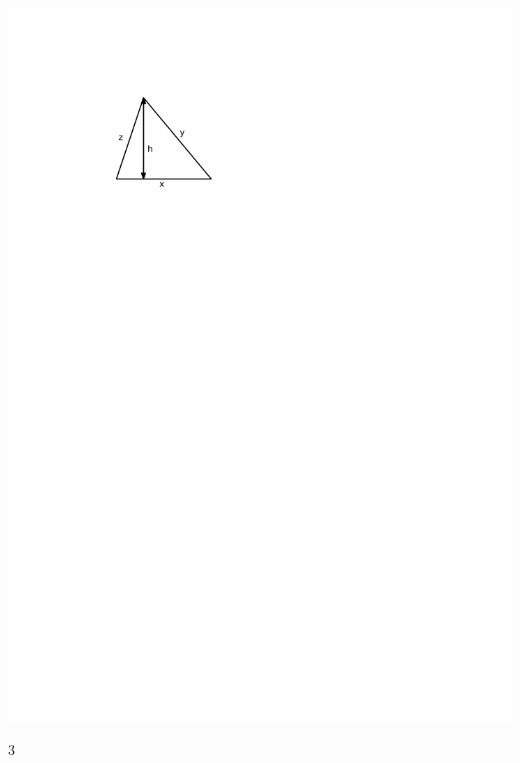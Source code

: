 \documentclass[a4paper,11pt]{report}
\begin{document}
\begin{exop}
{\begin{tasks}
     \begin{center}
     \includegraphics[scale=1.0]{media/fa-10/triangle.pdf}
\end{center}

\end{tasks}

  
}
{3}
\end{exop}
\end{document}
